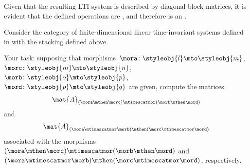 Given that the resulting LTI system is described by diagonal block matrices, it is evident that the defined operations are , and therefore \LTI is an  .

\begin{gradedexercise}
    \label{ex:StackingLTI}

    Consider the category of finite-dimensional linear time-invariant systems defined in  with the stacking defined above.

    Your task:
    supposing that morphisms~$\mora\colon \styleobj{l}\mto \styleobj{m}$,~$\morc\colon \styleobj{m}\mto \styleobj{n}$,~$\morb\colon \styleobj{o}\mto \styleobj{p}$,~$\mord\colon \styleobj{p}\mto \styleobj{q}$ are given, compute the matrices
    \begin{equation}
        \mat{A}_{(\mora \mthen \morc)\mtimescatmor (\morb\mthen \mord)}
    \end{equation}
    and
    \begin{equation}
        \mat{A}_{(\mora\mtimescatmor \morb)\mthen (\morc\mtimescatmor \mord)}
    \end{equation}
    associated with the morphisms $(\mora \mthen \morc)\mtimescatmor (\morb\mthen \mord)$ and $(\mora\mtimescatmor \morb)\mthen (\morc\mtimescatmor \mord)$, respectively.
\end{gradedexercise}

